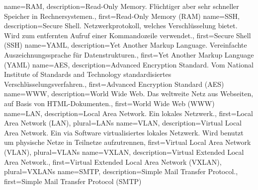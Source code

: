 {%
    name={RAM},
    description={Read-Only Memory. Flüchtiger aber sehr schneller
    Speicher in Rechnersystemen.},
    first={Read-Only Memory (RAM)}
}
{%
    name={SSH},
    description={Secure Shell. Netzwerkprotokoll, welches
    Verschlüsselung bietet. Wird zum entfernten Aufruf einer
    Kommandozeile verwendet.},
    first={Secure Shell (SSH)}
}
{%
    name={YAML},
    description={Yet Another Markup Language. Vereinfachte
    Auszeichnungssprache für Datenstrukturen.},
    first={Yet Another Markup Language (YAML)}
}
{%
    name={AES},
    description={Advanced Encryption Standard. Vom National Institute
    of Standards and Technology standardisiertes
    Verschlüsselungsverfahren.},
    first={Advanced Encryption Standard (AES)}
}
{%
    name={WWW},
    description={World Wide Web. Das weltweite Netz aus Webseiten, auf
    Basis von HTML-Dokumenten.},
    first={World Wide Web (WWW)}
}
{%
    name={LAN},
    description={Local Area Network. Ein lokales Netzwerk.},
    first={Local Area Network (LAN)},
    plural={LANs}
}
{%
    name={VLAN},
    description={Virtual Local Area Network. Ein via Software
    virtualisiertes lokales Netzwerk. Wird benutzt um physische Netze in
    Teilnetze aufzutrennen},
    first={Virtual Local Area Network (VLAN)},
    plural={VLANs}
}
{%
    name={VXLAN},
    description={Virtual Extended Local Area Network.},
    first={Virtual Extended Local Area Network (VXLAN)},
    plural={VXLANs}
}
{%
    name={SMTP},
    description={Simple Mail Transfer Protocol.},
    first={Simple Mail Transfer Protocol (SMTP)}
}

